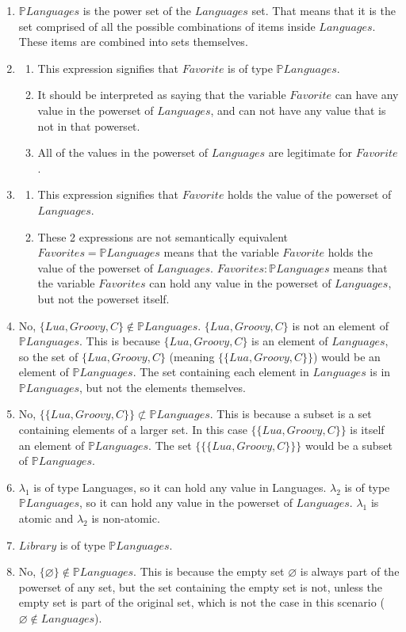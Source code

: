 \documentclass[12pt]{article}
\begin{document}
\begin{enumerate}
\item $\mathbb{P}Languages$ is the power set of the $Languages$ set. That means that it is the set comprised of all the possible combinations of items inside $Languages$. These items are combined into sets themselves. 
\item 
\begin{enumerate}
\item This expression signifies that $Favorite$ is of type $\mathbb{P}Languages$. 
\item It should be interpreted as saying that the variable $Favorite$ can have any value in the powerset of $Languages$, and can not have any value that is not in that powerset. 
\item All of the values in the powerset of $Languages$ are legitimate for $Favorite$. 
\end{enumerate}
\item 
\begin{enumerate}
\item This expression signifies that $Favorite$ holds the value of the powerset of $Languages$. 
\item These 2 expressions are not semantically equivalent $Favorites = \mathbb{P}Languages$ means that the variable  $Favorite$ holds the value of the powerset of $Languages$. $Favorites:\mathbb{P}Languages$ means that the variable $Favorites$ can hold any value in the powerset of $Languages$, but not the powerset itself.
\end{enumerate}
\item No, $\{Lua, Groovy, C\} \notin \mathbb{P}Languages$. $\{Lua, Groovy, C\}$ is not an element of $\mathbb{P}Languages$. This is because $\{Lua, Groovy, C\}$ is an element of $Languages$, so the set of $\{Lua, Groovy, C\} $ (meaning $\{\{Lua, Groovy, C\}\} $)  would be an element of $\mathbb{P}Languages$. The set containing each element in $Languages$ is in $\mathbb{P}Languages$, but not the elements themselves.

\item No, $\{\{Lua, Groovy, C\}\} \not\subset \mathbb{P}Languages$. This is because a subset is a set containing elements of a larger set. In this case $\{\{Lua, Groovy, C\}\}$ is itself an element of $\mathbb{P}Languages$. The set  $\{\{\{Lua, Groovy, C\}\}\}$ would be a subset of $\mathbb{P}Languages$.

\item $\lambda_{1}$ is of type Languages, so it can hold any value in Languages. $\lambda_{2}$ is of type $\mathbb{P}Languages$, so it can hold any value in the powerset of $Languages$. $\lambda_{1}$ is atomic and $\lambda_{2}$ is non-atomic.
\item $Library$ is of type $\mathbb{P}Languages$.
\item No, $\{\varnothing \} \notin 
\mathbb{P}Languages$. This is because the empty set $\varnothing$ is always part of the powerset of any set, but the set containing the empty set is not, unless the empty set is part of the original set, which is not the case in this scenario ($\varnothing \notin Languages$).
\end{enumerate}
\end{document}
